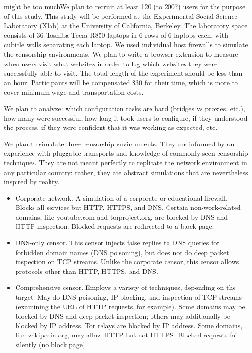 \documentclass{sig-alternate-hotpets15}
\begin{document}
{\color {red} might be too much}We plan to recruit at least 120 (to 200?) users for the purpose of this study. This study will be performed at the Experimental Social Science Laboratory (Xlab) at the University of California, Berkeley. The laboratory space consists of 36 Toshiba Tecra R850 laptops in 6 rows of 6 laptops each, with cubicle walls separating each laptop. We used individual host firewalls to simulate the censorship environments. We plan to write a browser extension to measure when users visit what websites in order to log which websites they were successfully able to visit. The total length of the experiment should be less than an hour. Participants will be compensated \$30 for their time, which is more to cover minimum wage and transportation costs.  

We plan to analyze: which configuration tasks are hard (bridges vs proxies, etc.), how many were successful, how long it took users to configure, if they understood the process, if they were confident that it was working as expected, etc. 

We plan to simulate three censorship environments.
They are informed by our experience with pluggable transports
and knowledge of commonly seen censorship techniques.
They are not meant perfectly to replicate the network environment
in any particular country; rather, they are abstract simulations
that are nevertheless inspired by reality.

\begin{itemize}
\item{Corporate network.}
A simulation of a corporate or educational firewall.
Blocks all services but HTTP, HTTPS, and DNS.
Certain non-work-related domains, like youtube.com and torproject.org,
are blocked by DNS and HTTP inspection.
Blocked requests are redirected to a block page.
\item{DNS-only censor.}
This censor injects false replies to DNS queries
for forbidden domain names (DNS poisoning),
but does not do deep packet inspection on TCP streams.
Unlike the corporate censor, this censor allows protocols
other than HTTP, HTTPS, and DNS.
\item{Comprehensive censor.}
Employs a variety of techniques, depending on the target.
May do DNS poisoning, IP blocking, and inspection of TCP streams
(examining the URL of HTTP requests, for example).
Some domains may be blocked by DNS and deep packet inspection;
others may additionally be blocked by IP address.
Tor relays are blocked by IP address.
Some domains, like wikipedia.org, may allow HTTP but not HTTPS.
Blocked requests fail silently (no block page).
\end{itemize}
\end{document}
